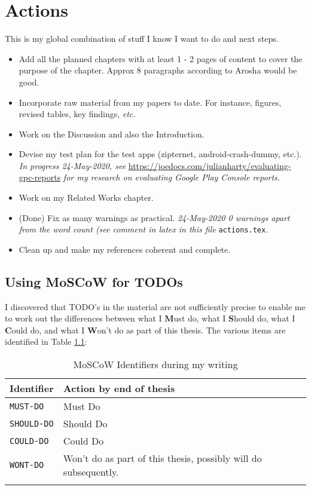\chapter{Actions}
This is my global combination of stuff I know I want to do and next steps.
\begin{itemize}
    \item Add all the planned chapters with at least 1 - 2 pages of content to cover the purpose of the chapter. Approx 8 paragraphs according to Arosha would be good.
    \item Incorporate raw material from my papers to date. For instance, figures, revised tables, key findings, \emph{etc.}
    \item Work on the Discussion and also the Introduction.
    \item Devise my test plan for the test apps (zipternet, android-crash-dummy, etc.). \emph{In progress 24-May-2020, see} \url{https://joedocs.com/julianharty/evaluating-gpc-reports} \emph{for my research on evaluating Google Play Console reports.}
    \item Work on my Related Works chapter.
    \item (Done) Fix as many warnings as practical. \emph{24-May-2020 0 warnings apart from the word count (see comment in latex in this file} \texttt{actions.tex}. 
    \item Clean up and make my references coherent and complete.
\end{itemize}


\section{Using MoSCoW for TODOs}
I discovered that TODO's in the material are not sufficiently precise to enable me to work out the differences between what I \textbf{M}ust do, what I \textbf{S}hould do, what I \textbf{C}ould do, and what I \textbf{W}on't do as part of this thesis. The various items are identified in Table \ref{tab:moscow_for_todos}:

\begin{table}[ht]
    \centering
    \begin{tabular}{l|l}
       Identifier         &Action by end of thesis \\
       \hline
       \texttt{MUST-DO}   &Must Do  \\
       \texttt{SHOULD-DO} &Should Do \\
       \texttt{COULD-DO}  &Could Do \\
       \texttt{WONT-DO}   &Won't do as part of this thesis, possibly will do subsequently. \\
         & 
    \end{tabular}
    \caption{MoSCoW Identifiers during my writing}
    \label{tab:moscow_for_todos}
\end{table}